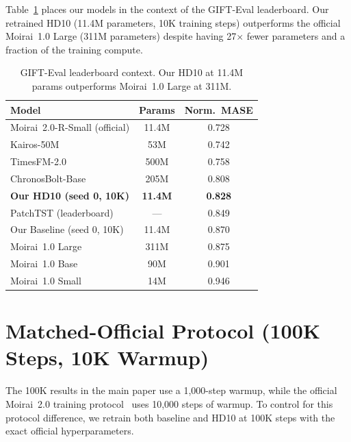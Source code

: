 \documentclass{article}
\begin{document}
Table~\ref{tab:leaderboard} places our models in the context of the GIFT-Eval leaderboard. Our retrained HD10 (11.4M parameters, 10K training steps) outperforms the official Moirai~1.0 Large (311M parameters) despite having 27$\times$ fewer parameters and a fraction of the training compute.

\begin{table}[h]
\centering
\caption{GIFT-Eval leaderboard context. Our HD10 at 11.4M params outperforms Moirai~1.0 Large at 311M.}
\label{tab:leaderboard}
\small
\begin{tabular}{lcc}
\toprule
\textbf{Model} & \textbf{Params} & \textbf{Norm.\ MASE} \\
\midrule
Moirai~2.0-R-Small (official) & 11.4M & 0.728 \\
Kairos-50M & 53M & 0.742 \\
TimesFM-2.0 & 500M & 0.758 \\
ChronosBolt-Base & 205M & 0.808 \\
\textbf{Our HD10 (seed 0, 10K)} & \textbf{11.4M} & \textbf{0.828} \\
PatchTST (leaderboard) & --- & 0.849 \\
Our Baseline (seed 0, 10K) & 11.4M & 0.870 \\
Moirai~1.0 Large & 311M & 0.875 \\
Moirai~1.0 Base & 90M & 0.901 \\
Moirai~1.0 Small & 14M & 0.946 \\
\bottomrule
\end{tabular}
\end{table}

\section{Matched-Official Protocol (100K Steps, 10K Warmup)}
\label{app:matched_official}

The 100K results in the main paper use a 1,000-step warmup, while the official Moirai~2.0 training protocol~\citep{liu2024moirai2} uses 10,000 steps of warmup. To control for this protocol difference, we retrain both baseline and HD10 at 100K steps with the exact official hyperparameters.
\end{document}
